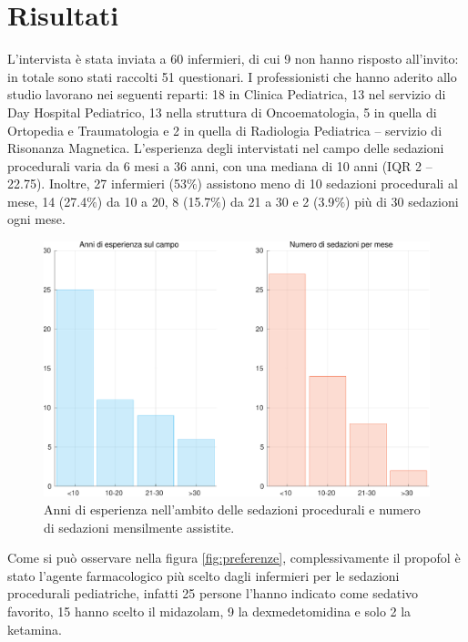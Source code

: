 \chapter{Risultati}

L'intervista è stata inviata a 60 infermieri, di cui 9 non hanno risposto all'invito: in totale sono stati raccolti 51 questionari. I professionisti che hanno aderito allo studio lavorano nei seguenti reparti: 18 in Clinica Pediatrica, 13 nel servizio di Day Hospital Pediatrico, 13 nella struttura di Oncoematologia, 5 in quella di Ortopedia e Traumatologia e 2 in quella di Radiologia Pediatrica -- servizio di Risonanza Magnetica. L'esperienza degli intervistati nel campo delle sedazioni procedurali varia da 6 mesi a 36 anni, con una mediana di 10 anni (IQR 2 -- 22.75). Inoltre, 27 infermieri (53$\%$) assistono meno di 10 sedazioni procedurali al mese, 14 (27.4$\%$) da 10 a 20, 8 (15.7$\%$) da 21 a 30 e 2 (3.9$\%$) più di 30 sedazioni ogni mese. 

\vfill

\begin{figure}[!ht]
    \centering
    \includegraphics[width=1\textwidth]{Figure/esperienzaVSfrequenza.pdf}
    \caption{Anni di esperienza nell'ambito delle sedazioni procedurali e numero di sedazioni mensilmente assistite.} %
    \label{fig:esperienzavsfrequenza}
\end{figure}

\vfill

\newpage
Come si può osservare nella figura \ref{fig:preferenze}, complessivamente il propofol è stato l'agente farmacologico più scelto dagli infermieri per le sedazioni procedurali pediatriche, infatti 25 persone l'hanno indicato come sedativo favorito, 15 hanno scelto il midazolam, 9 la dexmedetomidina e solo 2 la ketamina. 

